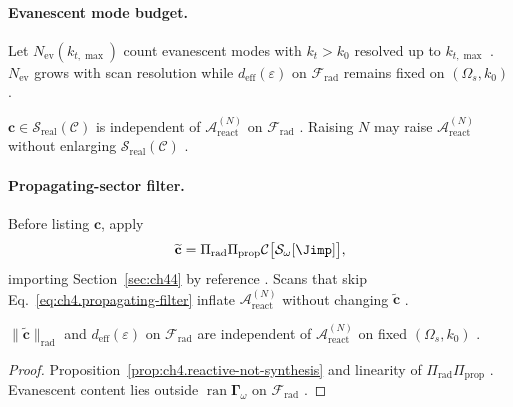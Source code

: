 \paragraph{Evanescent mode budget.}
Let \(N_{\mathrm{ev}}(k_{t,\max})\) count evanescent modes with \(k_{t}>k_{0}\) resolved up to \(k_{t,\max}\) \cite{jackson1999,hansen1988}.
\(N_{\mathrm{ev}}\) grows with scan resolution while \(d_{\mathrm{eff}}(\varepsilon)\) on \(\mathcal{F}_{\mathrm{rad}}\) remains fixed on
\((\Omega_{s},k_{0})\) \cite{stratton1941,harrington2001,devaney2004}.

\begin{proposition}
\label{prop:ch4.reactive-not-synthesis}
\(\mathbf{c}\in\mathcal{S}_{\mathrm{real}}(\mathcal{C})\) is independent of \(\mathcal{A}_{\mathrm{react}}^{(N)}\) on \(\mathcal{F}_{\mathrm{rad}}\)
\cite{stratton1941,harrington2001}. Raising \(N\) may raise \(\mathcal{A}_{\mathrm{react}}^{(N)}\) without enlarging
\(\mathcal{S}_{\mathrm{real}}(\mathcal{C})\) \cite{devaney2004,hansen1988}.
\end{proposition}

\paragraph{Propagating-sector filter.}
Before listing \(\mathbf{c}\), apply
\begin{equation}
\label{eq:ch4.propagating-filter}
\widetilde{\mathbf{c}}=\Pi_{\mathrm{rad}}\Pi_{\mathrm{prop}}\mathcal{C}\big[\mathcal{S}_\omega[\Jimp]\big],
\end{equation}
importing Section~\ref{sec:ch44} by reference \cite{stratton1941,harrington2001}. Scans that skip Eq.~\eqref{eq:ch4.propagating-filter} inflate
\(\mathcal{A}_{\mathrm{react}}^{(N)}\) without changing \(\widetilde{\mathbf{c}}\) \cite{devaney2004,hansen1988}.

\begin{theorem}
\label{thm:ch4.ev-invisible-export}
\(\|\widetilde{\mathbf{c}}\|_{\mathrm{rad}}\) and \(d_{\mathrm{eff}}(\varepsilon)\) on \(\mathcal{F}_{\mathrm{rad}}\) are independent of
\(\mathcal{A}_{\mathrm{react}}^{(N)}\) on fixed \((\Omega_{s},k_{0})\) \cite{stratton1941,harrington2001,devaney2004,hansen1988}.
\end{theorem}
\begin{proof}
Proposition~\ref{prop:ch4.reactive-not-synthesis} and linearity of \(\Pi_{\mathrm{rad}}\Pi_{\mathrm{prop}}\) \cite{stratton1941,harrington2001}. Evanescent
content lies outside \(\operatorname{ran}\boldsymbol{\Gamma}_\omega\) on \(\mathcal{F}_{\mathrm{rad}}\) \cite{devaney2004,hansen1988}.
\end{proof}

